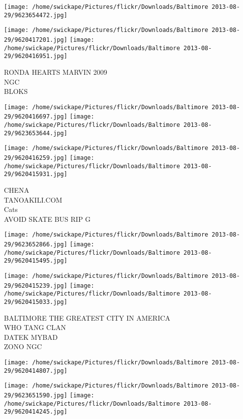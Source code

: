 \documentclass[10pt,letterpaper]{article}
\begin{document}
\texttt{[image: /home/swickape/Pictures/flickr/Downloads/Baltimore 2013-08-29/9623654472.jpg]}

\vspace{0.25in}
\texttt{[image: /home/swickape/Pictures/flickr/Downloads/Baltimore 2013-08-29/9620417201.jpg]}
\texttt{[image: /home/swickape/Pictures/flickr/Downloads/Baltimore 2013-08-29/9620416951.jpg]}

RONDA HEARTS MARVIN 2009\\
NGC\\
BLOKS
\pagebreak

\texttt{[image: /home/swickape/Pictures/flickr/Downloads/Baltimore 2013-08-29/9620416697.jpg]}
\texttt{[image: /home/swickape/Pictures/flickr/Downloads/Baltimore 2013-08-29/9623653644.jpg]}

\texttt{[image: /home/swickape/Pictures/flickr/Downloads/Baltimore 2013-08-29/9620416259.jpg]}
\texttt{[image: /home/swickape/Pictures/flickr/Downloads/Baltimore 2013-08-29/9620415931.jpg]}

CHENA\\
TANOAKILI.COM\\
Cats\\
AVOID SKATE BUS RIP G
\pagebreak

\texttt{[image: /home/swickape/Pictures/flickr/Downloads/Baltimore 2013-08-29/9623652866.jpg]}
\texttt{[image: /home/swickape/Pictures/flickr/Downloads/Baltimore 2013-08-29/9620415495.jpg]}

\texttt{[image: /home/swickape/Pictures/flickr/Downloads/Baltimore 2013-08-29/9620415239.jpg]}
\texttt{[image: /home/swickape/Pictures/flickr/Downloads/Baltimore 2013-08-29/9620415033.jpg]}

BALTIMORE THE GREATEST CITY IN AMERICA\\
WHO TANG CLAN\\
DATEK MYBAD\\
ZONO NGC
\pagebreak

\texttt{[image: /home/swickape/Pictures/flickr/Downloads/Baltimore 2013-08-29/9620414807.jpg]}

\vspace{0.25in}
\texttt{[image: /home/swickape/Pictures/flickr/Downloads/Baltimore 2013-08-29/9623651590.jpg]}
\texttt{[image: /home/swickape/Pictures/flickr/Downloads/Baltimore 2013-08-29/9620414245.jpg]}
\end{document}
